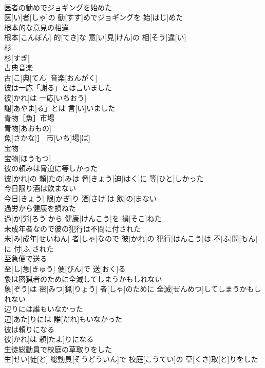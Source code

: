 \documentclass[8pt]{extreport}
\begin{document}
\begin{CJK}{UTF8}{min}
\\	医者の勧めでジョギングを始めた	
\\	医[い]者[しゃ]の 勧[すす]めでジョギングを 始[はじ]めた
\\	根本的な意見の相違	
\\	根本[こんぽん] 的[てき]な 意[い]見[けん]の 相[そう]違[い]
\\	杉	
\\	杉[すぎ]
\\	古典音楽	
\\	古[こ]典[てん] 音楽[おんがく]
\\	彼は一応「謝る」とは言いました	
\\	彼[かれ]は 一応[いちおう]
\\	謝[あやま]る」とは 言[い]いました
\\	青物［魚］市場	
\\	青物[あおもの]
\\	魚[さかな]］ 市[いち]場[ば]
\\	宝物	
\\	宝物[ほうもつ]
\\	彼の頼みは脅迫に等しかった	
\\	彼[かれ]の 頼[たの]みは 脅[きょう]迫[はく]に 等[ひと]しかった
\\	今日限り酒は飲まない	
\\	今日[きょう] 限[かぎ]り 酒[さけ]は 飲[の]まない
\\	過労から健康を損ねた	
\\	過[か]労[ろう]から 健康[けんこう]を 損[そこ]ねた
\\	未成年者なので彼の犯行は不問に付された	
\\	未[み]成年[せいねん] 者[しゃ]なので 彼[かれ]の 犯行[はんこう]は 不[ふ]問[もん]に 付[ふ]された
\\	至急便で送る	
\\	至[し]急[きゅう] 便[びん]で 送[おく]る
\\	象は密猟者のために全滅してしまうかもしれない	
\\	象[ぞう]は 密[みつ]猟[りょう] 者[しゃ]のために 全滅[ぜんめつ]してしまうかもしれない
\\	辺りには誰もいなかった	
\\	辺[あた]りには 誰[だれ]もいなかった
\\	彼は頼りになる	
\\	彼[かれ]は 頼[たよ]りになる
\\	生徒総動員で校庭の草取りをした	
\\	生[せい]徒[と] 総動員[そうどういん]で 校庭[こうてい]の 草[くさ]取[と]りをした

\end{CJK}
\end{document}
